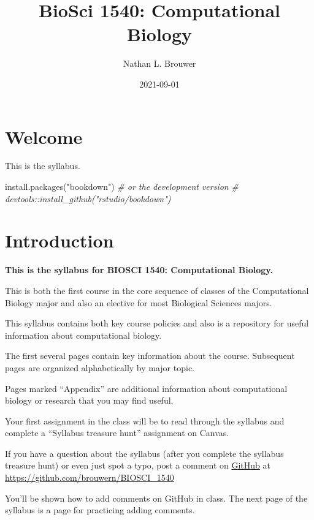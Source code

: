 \documentclass[
]{book}
\title{BioSci 1540: Computational Biology}
\author{Nathan L. Brouwer}
\date{2021-09-01}
\newenvironment{Shaded}{\begin{snugshade}}{\end{snugshade}}
\newcommand{\CommentTok}[1]{\textcolor[rgb]{0.56,0.35,0.01}{\textit{#1}}}
\newcommand{\FunctionTok}[1]{\textcolor[rgb]{0.00,0.00,0.00}{#1}}
\newcommand{\NormalTok}[1]{#1}
\newcommand{\StringTok}[1]{\textcolor[rgb]{0.31,0.60,0.02}{#1}}
\begin{document}
\maketitle

{
\setcounter{tocdepth}{1}
\tableofcontents
}
\hypertarget{welcome}{%
\chapter{Welcome}\label{welcome}}

This is the syllabus.

\begin{Shaded}
\begin{Highlighting}[]
\FunctionTok{install.packages}\NormalTok{(}\StringTok{"bookdown"}\NormalTok{)}
\CommentTok{\# or the development version}
\CommentTok{\# devtools::install\_github("rstudio/bookdown")}
\end{Highlighting}
\end{Shaded}

\hypertarget{intro}{%
\chapter{Introduction}\label{intro}}

\textbf{This is the syllabus for BIOSCI 1540: Computational Biology.}

This is both the first course in the core sequence of classes of the Computational Biology major and also an elective for most Biological Sciences majors.

This syllabus contains both key course policies and also is a repository for useful information about computational biology.

The first several pages contain key information about the course. Subsequent pages are organized alphabetically by major topic.

Pages marked ``Appendix'' are additional information about computational biology or research that you may find useful.

Your first assignment in the class will be to read through the syllabus and complete a ``Syllabus treasure hunt'' assignment on Canvas.

If you have a question about the syllabus (after you complete the syllabus treasure hunt) or even just spot a typo, post a comment on \href{https://github.com/brouwern/BIOSCI_1540}{GitHub} at \url{https://github.com/brouwern/BIOSCI_1540}

You'll be shown how to add comments on GitHub in class. The next page of the syllabus is a page for practicing adding comments.
\end{document}
